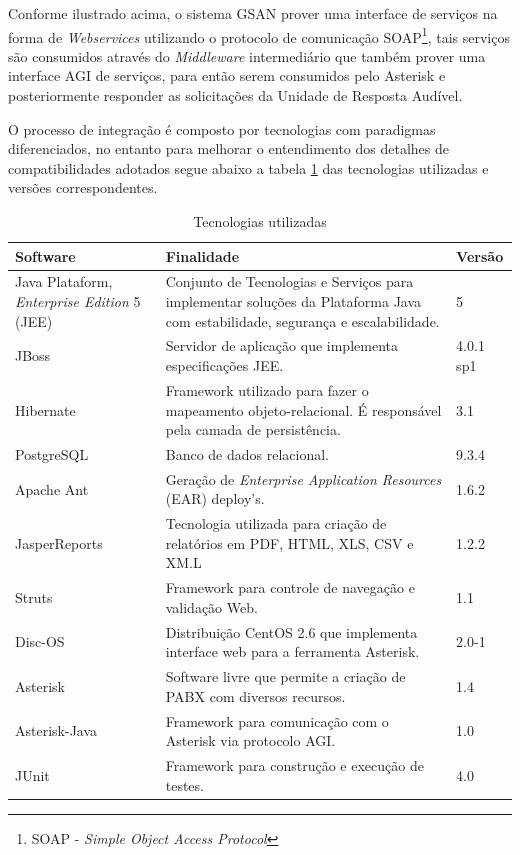Conforme ilustrado acima, o sistema GSAN prover uma interface de serviços na forma de \textit{Webservices} utilizando o protocolo de comunicação SOAP\footnote{SOAP - \textit{Simple Object Access Protocol}}, tais serviços são consumidos através do \textit{Middleware} intermediário que também prover uma interface AGI de serviços, para então serem consumidos pelo Asterisk e posteriormente responder as solicitações da Unidade de Resposta Audível.

O processo de integração é composto por tecnologias com paradigmas diferenciados, no entanto para melhorar o entendimento dos detalhes de compatibilidades adotados segue abaixo a tabela \ref{tabela:tecnologiasUtilizadas} das tecnologias utilizadas e versões correspondentes.


\begin{table}[H]
	\center
	\footnotesize
	\caption{Tecnologias utilizadas}
	\label{tabela:tecnologiasUtilizadas}
	\begin{tabular}{|p{4cm}|p{7cm}|p{2cm}|}
		\hline
		\textbf{Software} & \textbf{Finalidade} & \textbf{Versão} \\
		\hline
		Java Plataform, \textit{Enterprise Edition} 5 (JEE) & Conjunto de Tecnologias e Serviços para implementar soluções da Plataforma Java com estabilidade, segurança e escalabilidade. & 5 \\
		\hline
		JBoss 				& Servidor de aplicação que implementa especificações JEE. 								& 4.0.1 sp1 \\
		\hline
		Hibernate 			& Framework utilizado para fazer o mapeamento objeto-relacional. É responsável pela camada de persistência. & 3.1 \\
		\hline
		PostgreSQL 			& Banco de dados relacional. 															& 9.3.4 \\
		\hline
		Apache Ant 			& Geração de \textit{Enterprise Application Resources} (EAR) deploy’s. 					& 1.6.2 \\
		\hline
		JasperReports 		& Tecnologia utilizada para criação de relatórios em PDF, HTML, XLS, CSV e XM.L 		& 1.2.2 \\
		\hline
		Struts 				& Framework para controle de navegação e validação Web. 								& 1.1	 \\
		\hline
		Disc-OS 			& Distribuição CentOS 2.6 que implementa interface web para a ferramenta Asterisk. 		& 2.0-1 \\
		\hline
		Asterisk 			& Software livre que permite a criação de PABX com diversos recursos. 					& 1.4 \\		
		\hline
		Asterisk-Java 		& Framework para comunicação com o Asterisk via protocolo AGI. 							& 1.0 \\
		\hline
		JUnit		 		& Framework para construção e execução de testes. 										& 4.0 \\		
		\hline			
	\end{tabular}
\end{table}



